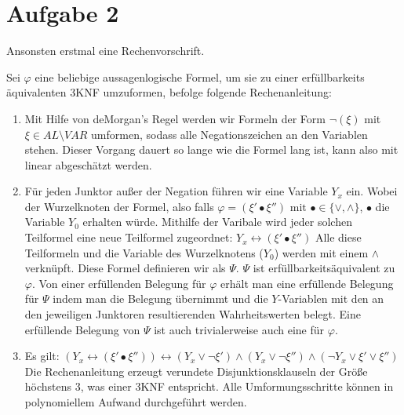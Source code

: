 \documentclass[a4paper,10pt]{article}
\begin{document}
\section*{Aufgabe 2}
	Ansonsten erstmal eine Rechenvorschrift.

	Sei $\varphi$ eine beliebige aussagenlogische Formel, um sie zu einer erfüllbarkeits
	\"aquivalenten 3KNF umzuformen, befolge folgende Rechenanleitung:
	\begin{enumerate}
		\item 	Mit Hilfe von deMorgan's Regel werden wir Formeln der Form 
			$\lnot(\xi)$ mit $\xi \in AL\setminus VAR$ umformen, sodass alle 
			Negationszeichen an den Variablen stehen. 
			Dieser Vorgang dauert so lange wie die Formel lang ist, kann also mit
			linear abgeschätzt werden.
		\item   Für jeden Junktor außer der Negation führen wir eine 
			Variable $Y_x$ ein. Wobei der Wurzelknoten der Formel, also falls 
			$\varphi = (\xi' \bullet \xi'') \text{ mit } \bullet \in \{\lor, \land\}$, 
			$\bullet$ die Variable 
			$Y_0$ erhalten würde. Mithilfe der Varibale wird jeder solchen Teilformel 
			eine neue Teilformel zugeordnet: 
			$Y_x \leftrightarrow (\xi' \bullet \xi'')$
			Alle diese Teilformeln und die Variable des Wurzelknotens ($Y_0$) werden mit einem $\land$ verknüpft. Diese 
			Formel definieren wir als $\Psi$. 
			$\Psi$ ist erfüllbarkeitsäquivalent zu 
			$\varphi$. Von einer erfüllenden Belegung für $\varphi$ erhält 
			man eine erfüllende Belegung für $\Psi$ indem man die Belegung 
			übernimmt und die $Y$-Variablen mit den an den jeweiligen Junktoren 
			resultierenden Wahrheitswerten belegt. Eine erfüllende Belegung von 
			$\Psi$ ist auch trivialerweise auch eine für $\varphi$.
		\item	Es gilt: $(Y_x \leftrightarrow (\xi' \bullet \xi'')) 
			\leftrightarrow (Y_x \lor \lnot \xi') \land (Y_x \lor \lnot \xi'') 				\land (\lnot Y_x \lor \xi' \lor \xi'')$
Die Rechenanleitung erzeugt verundete Disjunktionsklauseln der Größe höchstens 3, was einer 3KNF entspricht. Alle Umformungsschritte können in polynomiellem Aufwand durchgeführt werden.
			
	\end{enumerate}
\end{document}
